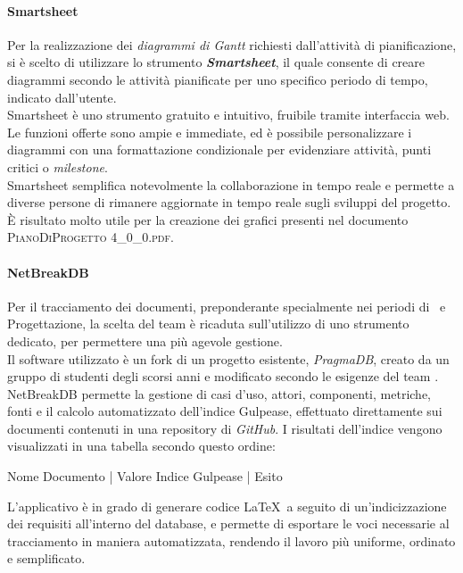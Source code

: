 		\paragraph{Smartsheet}
		Per la realizzazione dei \textit{diagrammi di Gantt} richiesti dall'attività di pianificazione, si è scelto di utilizzare lo strumento \textit{\textbf{Smartsheet}}, il quale consente di creare diagrammi secondo le attività pianificate per uno specifico periodo di tempo, indicato dall'utente.\\
		Smartsheet è uno strumento gratuito e intuitivo, fruibile tramite interfaccia web. Le funzioni offerte sono ampie e immediate, ed è possibile personalizzare i diagrammi con una formattazione condizionale per evidenziare attività, punti critici o \textit{milestone}.\\
		Smartsheet semplifica notevolmente la collaborazione in tempo reale e permette a diverse persone di rimanere aggiornate in tempo reale sugli sviluppi del progetto. \MakeUppercase{è} risultato molto utile per la creazione dei grafici presenti nel documento \textsc{PianoDiProgetto 4\_0\_0.pdf}.
		
		\paragraph{NetBreakDB}
		Per il tracciamento dei documenti, preponderante specialmente nei periodi di \AdR\ e Progettazione, la scelta del team è ricaduta sull'utilizzo di uno strumento dedicato, per permettere una più agevole gestione.\\
		Il software utilizzato è un fork di un progetto esistente, \textit{PragmaDB}, creato da un gruppo di studenti degli scorsi anni e modificato secondo le esigenze del team \textit{\gruppo}.\\
		NetBreakDB permette la gestione di casi d'uso, attori, componenti, metriche, fonti e il calcolo automatizzato dell'indice Gulpease, effettuato direttamente sui documenti contenuti in una repository di \textit{GitHub}. I risultati dell'indice vengono visualizzati in una tabella secondo questo ordine:
		\begin{center}
			Nome Documento | Valore Indice Gulpease | Esito
		\end{center}
		L'applicativo è in grado di generare codice \LaTeX\ a seguito di un'indicizzazione dei requisiti all'interno del database, e permette di esportare le voci necessarie al tracciamento in maniera automatizzata, rendendo il lavoro più uniforme, ordinato e semplificato.
		

